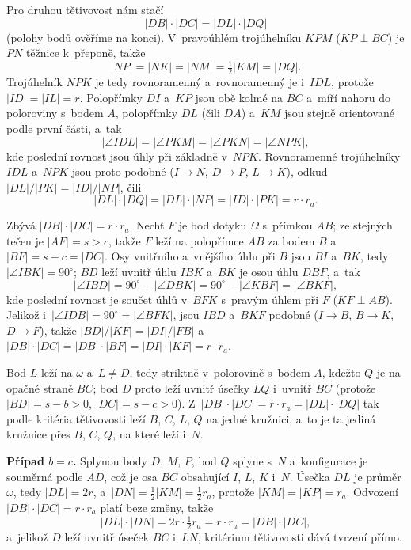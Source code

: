 {    Pro druhou tětivovost nám stačí
    $$
    |DB| \cdot |DC| = |DL| \cdot |DQ|
    $$
    (polohy bodů ověříme na konci). V~pravoúhlém trojúhelníku $KPM$ ($KP \perp BC$) je $PN$ těžnice k~přeponě, takže
    $$
    |NP| = |NK| = |NM| = \tfrac12|KM| = |DQ|.
    $$
    Trojúhelník $NPK$ je tedy rovnoramenný a~rovnoramenný je i~$IDL$, protože $|ID| = |IL| = r$. Polopřímky $DI$ a~$KP$ jsou obě kolmé na $BC$ a~míří nahoru do poloroviny s~bodem $A$, polopřímky $DL$ (čili $DA$) a~$KM$ jsou stejně orientované podle první části, a~tak
    $$
    |\angle IDL| = |\angle PKM| = |\angle PKN| = |\angle NPK|,
    $$
    kde poslední rovnost jsou úhly při základně v~$NPK$. Rovnoramenné trojúhelníky $IDL$ a~$NPK$ jsou proto podobné ($I \to N$, $D \to P$, $L \to K$), odkud $|DL|/|PK| = |ID|/|NP|$, čili
    $$
    |DL| \cdot |DQ| = |DL| \cdot |NP| = |ID| \cdot |PK| = r \cdot r_a.
    $$

    Zbývá $|DB| \cdot |DC| = r \cdot r_a$. Nechť $F$ je bod dotyku $\Omega$ s~přímkou $AB$; ze stejných tečen je $|AF| = s > c$, takže $F$ leží na polopřímce $AB$ za bodem $B$ a~$|BF| = s-c = |DC|$. Osy vnitřního a~vnějšího úhlu při $B$ jsou $BI$ a~$BK$, tedy $|\angle IBK| = 90^\circ$; $BD$ leží uvnitř úhlu $IBK$ a~$BK$ je osou úhlu $DBF$, a~tak
    $$
    |\angle IBD| = 90^\circ - |\angle DBK| = 90^\circ - |\angle KBF| = |\angle BKF|,
    $$
    kde poslední rovnost je součet úhlů v~$BFK$ s~pravým úhlem při $F$ ($KF \perp AB$). Jelikož i~$|\angle IDB| = 90^\circ = |\angle BFK|$, jsou $IBD$ a~$BKF$ podobné ($I \to B$, $B \to K$, $D \to F$), takže $|BD|/|KF| = |DI|/|FB|$ a~$|DB| \cdot |DC| = |DB| \cdot |BF| = |DI| \cdot |KF| = r \cdot r_a$.

    Bod $L$ leží na $\omega$ a~$L \neq D$, tedy striktně v~polorovině s~bodem $A$, kdežto $Q$ je na opačné straně $BC$; bod $D$ proto leží uvnitř úsečky $LQ$ i~uvnitř $BC$ (protože $|BD| = s-b > 0$, $|DC| = s-c > 0$). Z~$|DB| \cdot |DC| = r \cdot r_a = |DL| \cdot |DQ|$ tak podle kritéria tětivovosti leží $B$, $C$, $L$, $Q$ na jedné kružnici, a~to je ta jediná kružnice přes $B$, $C$, $Q$, na které leží i~$N$.

    \textbf{Případ $b=c$.} Splynou body $D$, $M$, $P$, bod $Q$ splyne s~$N$ a~konfigurace je souměrná podle $AD$, což je osa $BC$ obsahující $I$, $L$, $K$ i~$N$. Úsečka $DL$ je průměr $\omega$, tedy $|DL| = 2r$, a~$|DN| = \tfrac12|KM| = \tfrac12 r_a$, protože $|KM| = |KP| = r_a$. Odvození $|DB| \cdot |DC| = r \cdot r_a$ platí beze změny, takže
    $$
    |DL| \cdot |DN| = 2r \cdot \tfrac12 r_a = r \cdot r_a = |DB| \cdot |DC|,
    $$
    a~jelikož $D$ leží uvnitř úseček $BC$ i~$LN$, kritérium tětivovosti dává tvrzení přímo.
}


